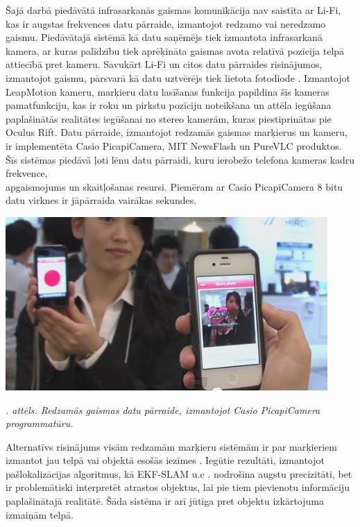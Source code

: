 \documentclass[12pt, a4paper, oneside, openright]{article}
\renewcommand{\thecimages}{\arabic{cimages}}
\begin{document}
\par
Šajā darbā piedāvātā infrasarkanās gaismas komunikācija nav saistīta ar Li-Fi, kas ir augstas
frekvences datu pārraide, izmantojot redzamo vai neredzamo gaismu. Piedāvātajā sistēmā kā datu
saņēmējs tiek izmantota infrasarkanā kamera, ar kuras palīdzību tiek aprēķināta gaismas avota
relatīvā pozīcija telpā attiecībā pret kameru. Savukārt Li-Fi un citos datu pārraides risinājumos,
izmantojot gaismu, pārsvarā kā datu uztvērējs tiek lietota fotodiode \cite{StefanSchmid2013} \cite{JosefZiegler2014} \cite{StefanMangold2013}. 
Izmantojot LeapMotion
kameru, marķieru datu lasīšanas funkcija papildina šīs kameras pamatfunkciju, kas ir roku un pirkstu
pozīciju noteikšana un attēla iegūšana paplašinātās realitātes iegūšanai no stereo kamerām, kuras
piestiprinātas pie Oculus Rift. Datu pārraide, izmantojot redzamās gaismas marķierus un kameru,
ir implementēta Casio PicapiCamera, MIT NewsFlash un PureVLC produktos. Šīs sistēmas piedāvā ļoti
lēnu datu pārraidi, kuru ierobežo telefona kameras kadru frekvence, \\ apgaismojums un skaitļošanas
resursi. Piemēram ar Casio PicapiCamera 8 bitu datu virknes ir jāpārraida vairākas sekundes.

\label{cimages:CasioPicapiCamera}
\vspace{10pt}
\begin{samepage}
\begin{center}
\includegraphics[width=0.5\columnwidth]{images/CasioPicapiCamera.png}
\begin{center}
\footnotesize{
\textit{\thecimages. attēls. Redzamās gaismas datu pārraide, izmantojot Casio PicapiCamera programmatūru.}}
\end{center}
\end{center}
\end{samepage}

\par
Alternatīvs risinājums visām redzamām marķieru sistēmām ir par marķieriem izmantot jau
telpā vai objektā esošās iezīmes \cite{MasayukiKanbara2002} \cite{GeorgKlein2007}. 
Iegūtie rezultāti, izmantojot pašlokalizācijas algoritmus, kā EKF-SLAM u.c \cite{MontemerloThrunKollarWegbreit} \cite{SebastianThrun}. nodrošina
augstu precizitāti, bet ir problemātiski interpretēt atrastos objektus, lai pie tiem pievienotu
informāciju paplašinātajā realitātē. Šāda sistēma ir arī jūtīga pret objektu izkārtojuma izmaiņām
telpā.
\end{document}
